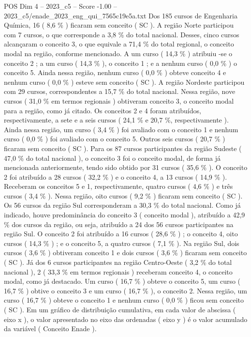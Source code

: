 \begin{textsample}{POS Dim 4 – 2023\_c5 – Score -1.00 – 2023\_c5/enade\_2023\_eng\_qui\_7565c19e5a.txt}
Dos 185 cursos de Engenharia Química, 16 ( 8,6 \% ) ficaram sem conceito ( SC ).
A região Norte participou com 7 cursos, o que corresponde a 3,8 \% do total nacional.
Desses, cinco cursos alcançaram o conceito 3, o que equivale a 71,4 \% do total regional, o conceito modal na região, conforme mencionado.
A um curso ( 14,3 \% ) atribuiu -se o conceito 2 ; a um curso ( 14,3 \% ), o conceito 1 ; e a nenhum curso ( 0,0 \% ) o conceito 5.
Ainda nessa região, nenhum curso ( 0,0 \% ) obteve conceito 4 e nenhum curso ( 0,0 \% ) esteve sem conceito ( SC ).
A região Nordeste participou com 29 cursos, correspondentes a 15,7 \% do total nacional.
Nessa região, nove cursos ( 31,0 \% em termos regionais ) obtiveram conceito 3, o conceito modal para a região, como já citado.
Os conceitos 2 e 4 foram atribuídos, respectivamente, a sete e a seis cursos ( 24,1 \% e 20,7 \%, respectivamente ).
Ainda nessa região, um curso ( 3,4 \% ) foi avaliado com o conceito 1 e nenhum curso ( 0,0 \% ) foi avaliado com o conceito 5.
Outros seis cursos ( 20,7 \% ) ficaram sem conceito ( SC ).
Para os 87 cursos participantes da região Sudeste ( 47,0 \% do total nacional ), o conceito 3 foi o conceito modal, de forma já mencionada anteriormente, tendo sido obtido por 31 cursos ( 35,6 \% ).
O conceito 2 foi atribuído a 28 cursos ( 32,2 \% ) e o conceito 4, a 13 cursos ( 14,9 \% ).
Receberam os conceitos 5 e 1, respectivamente, quatro cursos ( 4,6 \% ) e três cursos ( 3,4 \% ).
Nessa região, oito cursos ( 9,2 \% ) ficaram sem conceito ( SC ).
Os 56 cursos da região Sul corresponderam a 30,3 \% do total nacional.
Como já indicado, houve predominância do conceito 3 ( conceito modal ), atribuído a 42,9 \% dos cursos da região, ou seja, atribuído a 24 dos 56 cursos participantes na região Sul.
O conceito 2 foi atribuído a 16 cursos ( 28,6 \% ) ; o conceito 4, oito cursos ( 14,3 \% ) ; e o conceito 5, a quatro cursos ( 7,1 \% ).
Na região Sul, dois cursos ( 3,6 \% ) obtiveram conceito 1 e dois cursos ( 3,6 \% ) ficaram sem conceito ( SC ).
Já dos 6 cursos participantes na região Centro-Oeste ( 3,2 \% do total nacional ), 2 ( 33,3 \% em termos regionais ) receberam conceito 4, o conceito modal, como já destacado.
Um curso ( 16,7 \% ) obteve o conceito 5, um curso ( 16,7 \% ) obtive o conceito 3 e um curso ( 16,7 \% ), o conceito 2.
Nessa região, um curso ( 16,7 \% ) obteve o conceito 1 e nenhum curso ( 0,0 \% ) ficou sem conceito ( SC ).
Em um gráfico de distribuição cumulativa, em cada valor de abscissa ( eixo x ), o valor apresentado no eixo das ordenadas ( eixo y ) é o valor acumulado da variável ( Conceito Enade ).

\end{textsample}
